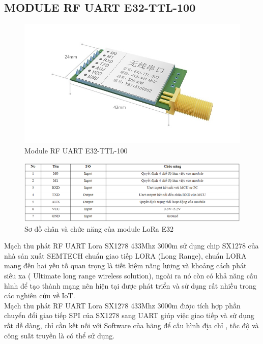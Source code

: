 \subsection{MODULE RF UART E32-TTL-100}
\begin{figure}[H]
	\centering
	\includegraphics[scale=.4]{Chapter 2/image chapter 2/E32.jpg}
	\caption[Module RF UART E32-TTL-100]{Module RF UART E32-TTL-100}
	\label{hinh35}
\end{figure}
\begin{figure}[H]
	\centering
	\includegraphics[scale=.5]{Chapter 2/image chapter 2/sodochanvachucnangE32.png}
	\caption[Sơ đồ chân và chức năng của module LoRa E32]{Sơ đồ chân và chức năng của module LoRa E32}
	\label{hinh36}
\end{figure}
Mạch thu phát RF UART Lora SX1278 433Mhz 3000m sử dụng chip SX1278 của nhà sản xuất SEMTECH chuẩn giao tiếp LORA (Long Range), chuẩn LORA mang đến hai yếu tố quan trọng là tiết kiệm năng lượng và khoảng cách phát siêu xa ( Ultimate long range wireless solution), ngoài ra nó còn có khả năng cấu hình để tạo thành mạng nên hiện tại được phát triển và sử dụng rất nhiều trong các nghiên cứu về IoT.\\
\indent Mạch thu phát RF UART Lora SX1278 433Mhz 3000m được tích hợp phần chuyển đổi giao tiếp SPI của SX1278 sang UART giúp việc giao tiếp và sử dụng rất dễ dàng, chỉ cần kết nối với Software của hãng để cấu hình địa chỉ , tốc độ và công suất truyền là có thể sử dụng.\\
